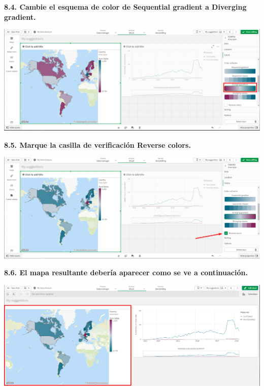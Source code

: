 \documentclass{article}
\begin{document}
\textbf{8.4. Cambie el esquema de 
color de \textbf{Sequential gradient} a \textbf{Diverging gradient}.}

    \begin{center}
		\includegraphics[width=14cm]{./images/26.1} 
	\end{center}
\newpage	
\textbf{8.5. Marque la casilla de 
verificación \textbf{Reverse colors}.}

    \begin{center}
		\includegraphics[width=14cm]{./images/26.2} 
	\end{center}
	
\textbf{8.6. El mapa resultante debería aparecer 
como se ve a continuación.}

    \begin{center}
		\includegraphics[width=14cm]{./images/27} 
	\end{center}

\newpage
\end{document}
